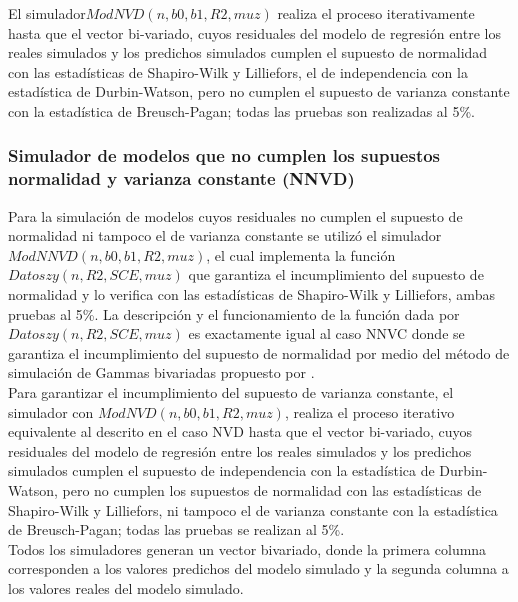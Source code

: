 El simulador$ ModNVD(n,b0,b1,R2,muz)$ realiza el proceso iterativamente hasta que el vector bi-variado, cuyos residuales del modelo de regresión entre los reales simulados y los predichos simulados cumplen el supuesto de normalidad con las estadísticas de Shapiro-Wilk y Lilliefors, el de independencia con la estadística de Durbin-Watson, pero no cumplen el supuesto de varianza constante con la estadística de Breusch-Pagan; todas las pruebas son realizadas al 5\%. 

\subsubsection{Simulador de modelos que no cumplen los supuestos normalidad y varianza constante (NNVD)}

Para la simulación de modelos cuyos residuales no cumplen el supuesto de normalidad ni tampoco el de varianza constante se utilizó el simulador $ModNNVD(n,b0,b1,R2,muz)$, el cual implementa la función $Datoszy(n,R2,SCE,muz)$ que garantiza el incumplimiento del supuesto de normalidad y lo verifica con las estadísticas de Shapiro-Wilk y Lilliefors, ambas pruebas al 5\%. La descripción y el funcionamiento de la función dada por \newline $Datoszy(n,R2,SCE,muz)$ es exactamente igual al caso NNVC donde se garantiza el incumplimiento del supuesto de normalidad por medio del método de simulación de Gammas bivariadas propuesto por \textcite{cheng-2011}.\\


Para garantizar el incumplimiento del supuesto de varianza constante, el simulador con \newline $ModNVD(n,b0,b1,R2,muz)$, realiza el proceso iterativo equivalente al descrito en el caso NVD hasta que el vector bi-variado, cuyos residuales del modelo de regresión entre los reales simulados y los predichos simulados cumplen el supuesto de independencia con la estadística de Durbin-Watson, pero no cumplen los supuestos de normalidad con las estadísticas de Shapiro-Wilk y Lilliefors, ni tampoco el de varianza constante con la estadística de Breusch-Pagan; todas las pruebas se realizan al 5\%.\\ 


Todos los simuladores generan un vector bivariado, donde la primera columna corresponden a los valores predichos del modelo simulado y la segunda columna a los valores reales del modelo simulado.\\




